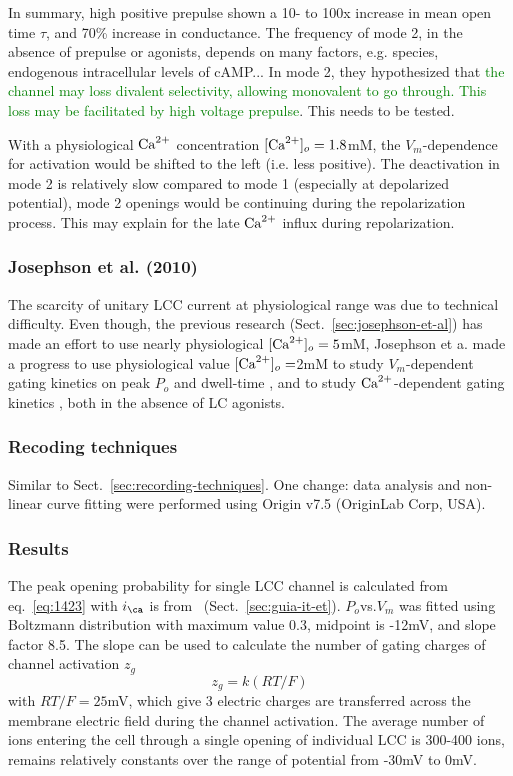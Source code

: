 In summary, high positive prepulse shown a 10- to 100x increase in
mean open time $\tau$, and 70\% increase in conductance. The frequency
of mode 2, in the absence of prepulse or agonists, depends on many
factors, e.g. species, endogenous intracellular levels of cAMP... In
mode 2, they hypothesized that
\textcolor{green}{the channel may loss divalent selectivity, allowing
  monovalent to go through. This loss may be facilitated by high
  voltage prepulse}. This needs to be tested. 


With a physiological ${\text{Ca}^{2+}}$ concentration $[{\text{Ca}^{2+}}]_o=1.8$mM, the
$V_m$-dependence for activation would be shifted to the left
(i.e. less positive). The deactivation in mode 2 is relatively slow
compared to mode 1 (especially at depolarized potential), mode 2
openings would be continuing during the repolarization process. This
may explain for the late ${\text{Ca}^{2+}}$ influx during repolarization.


\subsubsection{Josephson et al. (2010)}
\label{sec:josephson-et-al-1}

The scarcity of unitary LCC current at physiological range was due to
technical difficulty. Even though, the previous research
(Sect.~\ref{sec:josephson-et-al}) has made an effort to use nearly
physiological $[{\text{Ca}^{2+}}]_o=5$mM, Josephson et a. made a progress to use
physiological value $[{\text{Ca}^{2+}}]_o=$2mM to study $V_m$-dependent gating
kinetics on peak $P_o$ and dwell-time \citep{josephson2010pgp}, and to
study ${\text{Ca}^{2+}}$-dependent gating kinetics \citep{josephson2010cdc}, both
in the absence of LC agonists.

\subsubsection{Recoding techniques}
\label{sec:recoding-techniques}

Similar to Sect.~\ref{sec:recording-techniques}. One change: data
analysis and non-linear curve fitting were performed using Origin v7.5
(OriginLab Corp, USA).

\subsubsection{Results}
\label{sec:results-2}

The peak opening probability for single LCC channel is calculated from
eq.~\eqref{eq:1423} with $i_\ca$ is from~\citep{guia2001}
(Sect.~\ref{sec:guia-it-et}). $P_o$vs.$V_m$ was fitted using Boltzmann
distribution with maximum value 0.3, midpoint is -12mV, and slope
factor 8.5. The slope can be used to calculate the number of gating
charges of channel activation $z_g$
\begin{equation}
  \label{eq:1424}
  z_g = k(RT/F)
\end{equation}
with $RT/F=25$mV, which give 3 electric charges are transferred across
the membrane electric field during the channel activation. The average
number of ions entering the cell through a single opening of
individual LCC is 300-400 ions, remains relatively constants over the
range of potential from -30mV to 0mV.

